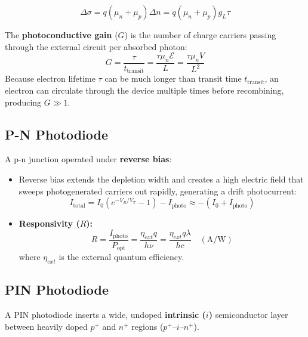 \documentclass[12pt,a4paper]{article}
\begin{document}
\begin{equation}
  \Delta \sigma = q (\mu_n + \mu_p) \Delta n = q (\mu_n + \mu_p) g_L \tau
\end{equation}

The \textbf{photoconductive gain} ($G$) is the number of charge carriers passing through the external circuit per absorbed photon:
\begin{equation}
  G = \frac{\tau}{t_{\text{transit}}} = \frac{\tau \mu_n \mathcal{E}}{L} = \frac{\tau \mu_n V}{L^2}
\end{equation}
Because electron lifetime $\tau$ can be much longer than transit time $t_{\text{transit}}$, an electron can circulate through the device multiple times before recombining, producing $G \gg 1$.

\subsection{P-N Photodiode}
A p-n junction operated under \textbf{reverse bias}:
\begin{itemize}[leftmargin=*, itemsep=3pt]
  \item Reverse bias extends the depletion width and creates a high electric field that sweeps photogenerated carriers out rapidly, generating a drift photocurrent:
  \begin{equation}
    I_{\text{total}} = I_0 \left( e^{-V_R / V_T} - 1 \right) - I_{\text{photo}} \approx - (I_0 + I_{\text{photo}})
  \end{equation}
  \item \textbf{Responsivity ($R$):}
  \begin{equation}
    R = \frac{I_{\text{photo}}}{P_{\text{opt}}} = \frac{\eta_{ext} q}{h\nu} = \frac{\eta_{ext} q \lambda}{hc} \quad (\text{A/W})
  \end{equation}
  where $\eta_{ext}$ is the external quantum efficiency.
\end{itemize}

\subsection{PIN Photodiode}
A PIN photodiode inserts a wide, undoped \textbf{intrinsic ($i$)} semiconductor layer between heavily doped $p^+$ and $n^+$ regions ($p^+\text{--}i\text{--}n^+$).
\end{document}
